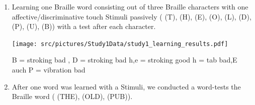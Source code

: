 \begin{enumerate}
    \item Learning one Braille word consisting out of three Braille characters with one affective/discriminative touch Stimuli passively ( (T), (H), (E), (O), (L), (D),  (P),  (U), (B)) with a test after each character.
    
        \centering
        \texttt{[image: src/pictures/Study1Data/study1\_learning\_results.pdf]}

\begin{table}[ht]
\caption{Results of Kruskal-Wallis significance tests for the different Braille characters during learning with a $\eta^2$ Effect Size.}
\label{table:learning_significance_results_firstStudy_nonParam}
\end{table}
B = stroking bad
, D = stroking bad
h,e = stroking good
h = tab bad,E auch
P = vibration bad

    \item After one word was learned with a Stimuli, we conducted a word-tests the Braille word ( (THE),  (OLD),  (PUB)).


\end{enumerate}
